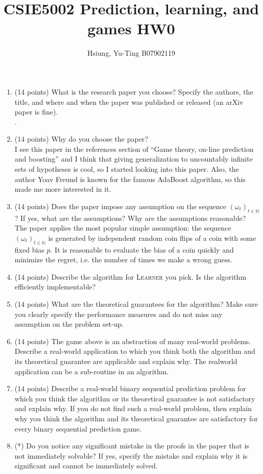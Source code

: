 \documentclass[a4paper, 12pt]{article}
\title{CSIE5002 Prediction, learning, and games HW0}
\author{Hsiung, Yu-Ting B07902119}
\newcommand{\N}{\mathbb{N}}
\begin{document}
\maketitle

\begin{enumerate}
    \item (14 points) What is the research paper you choose? Specify the authors, the title, and where and when the paper was published or released (an arXiv paper is fine).
    \\ {\color{blue} .}
    \item (14 points) Why do you choose the paper?
    \\ {\color{blue} I see this paper in the references section of ``Game theory, on-line prediction and boosting'' \cite{freund1996game} and I think that giving generalization to uncountably infinite sets of hypotheses is cool, so I started looking into this paper. Also, the author Yoav Freund is known for the famous AdaBoost algorithm, so this made me more interested in it.}
    \item (14 points) Does the paper impose any assumption on the sequence $(\omega_t)_{t \in \N}$? If yes, what are the assumptions? Why are the assumptions reasonable?
    \\ {\color{blue} The paper applies the most popular simple assumption: the sequence $(\omega_t)_{t \in \N}$ is generated by independent random coin flips of a coin with some fixed bias $p$. It is reasonable to evaluate the bias of a coin quickly and minimize the regret, i.e. the number of times we make a wrong guess.}

    \item (14 points) Describe the algorithm for \textsc{Learner} you pick. Is the algorithm efficiently implementable?
    \item (14 points) What are the theoretical guarantees for the algorithm? Make sure you clearly specify the performance measures and do not miss any assumption on the problem set-up.
    \item (14 points) The game above is an abstraction of many real-world problems. Describe a real-world application
    to which you think both the algorithm and its theoretical guarantee are applicable and explain why. The realworld application can be a sub-routine in an algorithm.
    \item (14 points) Describe a real-world binary sequential prediction problem for which you think the algorithm
    or its theoretical guarantee is not satisfactory and explain why. If you do not find such a real-world problem, then explain why you think the algorithm and its theoretical guarantee are satisfactory for every binary
    sequential prediction game.
    \item (*) Do you notice any significant mistake in the proofs in the paper that is not immediately solvable? If yes,
    specify the mistake and explain why it is significant and cannot be immediately solved.
\end{enumerate}

\printbibliography
\end{document}
